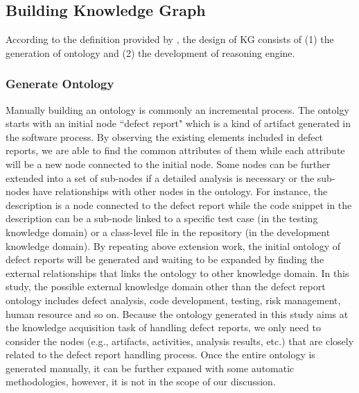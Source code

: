 \documentclass[12pt] {article}
\begin{document}
\subsection{Building Knowledge Graph}
According to the definition provided by , the design of KG consists of (1) the generation of ontology and (2) the development of reasoning engine.
\subsubsection{Generate Ontology}\label{sec:generate}
Manually building an ontology is commonly an incremental process.
The ontolgy starts with an initial node ``defect report" which is a kind of artifact generated in the software process.
By observing the existing elements included in defect reports, we are able to find the common attributes of them while each attribute will be a new node connected to the initial node.
Some nodes can be further extended into a set of sub-nodes if a detailed analysis is necessary or the sub-nodes have relationships with other nodes in the ontology.  
For instance, the description is a node connected to the defect report while the code snippet in the description can be a sub-node linked to a specific test case (in the testing knowledge domain) or a class-level file in the repository (in the development knowledge domain).
By repeating above extension work, the initial ontology of defect reports will be generated and waiting to be expanded by finding the external relationships that links the ontology to other knowledge domain.
In this study, the possible external knowledge domain other than the defect report ontology includes defect analysis, code development, testing, risk management, human resource and so on.  
Because the ontology generated in this study aims at the knowledge acquisition task of handling defect reports, we only need to consider the nodes (e.g., artifacts, activities, analysis results, etc.) that are closely related to the defect report handling process.
Once the entire ontology is generated manually, it can be further expaned with some automatic methodologies, however, it is not in the scope of our discussion.
\end{document}
